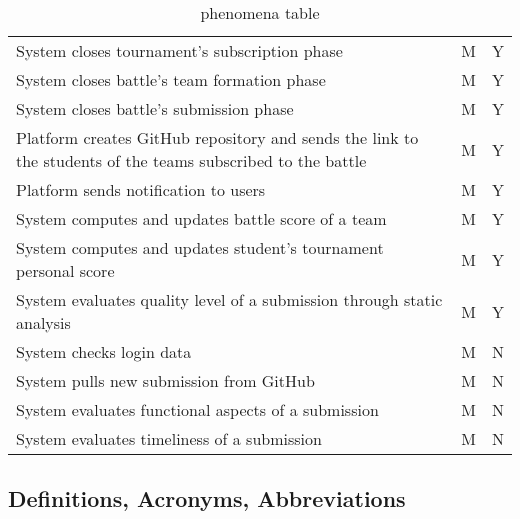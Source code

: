 \begin{table}[H]
\begin{tabular}{|p{9.5cm}|p{2cm}|p{1.5cm}|}
        System closes tournament's subscription phase & M & Y \\
        System closes battle's team formation phase & M & Y \\
        System closes battle's submission phase & M & Y \\
        Platform creates GitHub repository and sends the link to the students of the teams subscribed to the battle & M & Y \\
        Platform sends notification to users & M & Y \\
        System computes and updates battle score of a team & M & Y \\
        System computes and updates student's tournament personal score & M & Y \\
        System evaluates quality level of a submission through static analysis & M & Y \\
        System checks login data & M & N \\
        System pulls new submission from GitHub & M & N \\
        System evaluates functional aspects of a submission & M & N \\
        System evaluates timeliness of a submission & M & N \\
        \hline
    \end{tabular}
    \caption{phenomena table}
\end{table}
\newpage
\subsection{Definitions, Acronyms, Abbreviations}
